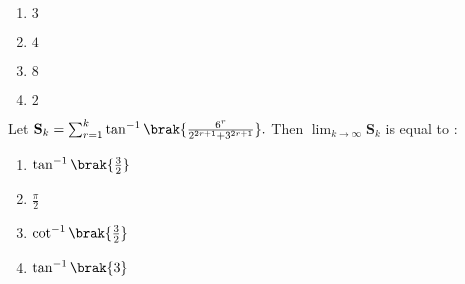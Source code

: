     \begin{enumerate}
        \item $3$
        \item $4$
        \item $8$
        \item $2$
    \end{enumerate}
    \item Let $\textbf{S}_k=\sum_{r=1}^k\tan^{-1}\brak{\frac{6^r}{2^{2r+1}+3^{2r+1}}}.$ Then $\lim_{k \to \infty}\textbf{S}_k$ is equal to $:$
	    \hfill{}   \\
    \begin{enumerate}
        \item $\tan^{-1}\brak{\frac{3}{2}}$
        \item $\frac{\pi}{2}$
        \item $\cot^{-1}\brak{\frac{3}{2}}$
        \item $\tan^{-1}\brak{3}$
    \end{enumerate}

